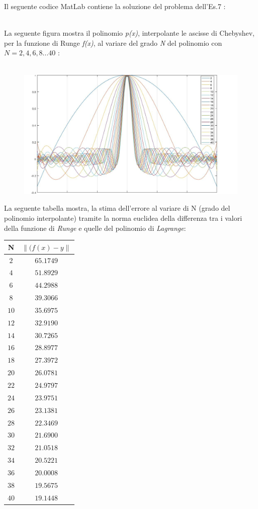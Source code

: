 Il seguente codice MatLab contiene la soluzione del problema dell'Es.7 :\\\
	
La seguente figura mostra il polinomio \textit{p(x)}, interpolante le ascisse di Chebyshev, per la funzione di Runge \textit{f(x)}, al variare del grado \textit{N} del polinomio con $N=2,4,6,8...40$ :\\\
	\begin{figure}[H]
  		\label{Cap_4_Es_7}
  		\includegraphics[width=\textwidth]{Plot/Cap_4_Es_7}
	\end{figure}
La seguente tabella mostra, la stima dell'errore al variare di N (grado del polinomio interpolante) tramite la norma euclidea 
della differenza tra i valori della funzione di \textit{Runge} e quelle del polinomio di \textit{Lagrange}:
	\begin{center}
		\begin{tabular}{|c|c|}
			\hline
				N & $\|(f(x)-y\|$ \\
    			\hline
    				$2$  & $65.1749$ \\
    				$4$  & $51.8929$ \\
    				$6$  & $44.2988$ \\
    				$8$  & $39.3066$ \\
    				$10$ & $35.6975$ \\
    				$12$ & $32.9190$ \\
    				$14$ & $30.7265$ \\
    				$16$ & $28.8977$ \\
    				$18$ & $27.3972$ \\
    				$20$ & $26.0781$ \\
    				$22$ & $24.9797$ \\
   					$24$ & $23.9751$ \\
    				$26$ & $23.1381$ \\
    				$28$ & $22.3469$ \\
    				$30$ & $21.6900$ \\
    				$32$ & $21.0518$ \\
    				$34$ & $20.5221$ \\
    				$36$ & $20.0008$ \\
    				$38$ & $19.5675$ \\
    				$40$ & $19.1448$ \\
				\hline
		\end{tabular}
	\end{center} 